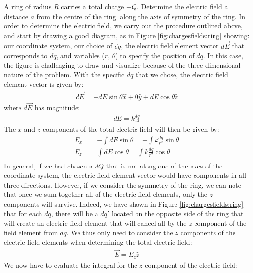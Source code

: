 \begin{example}{\label{ex:chargesfields:ring}A ring of radius $R$ carries a total charge $+Q$. Determine the electric field a distance $a$ from the centre of the ring, along the axis of symmetry of the ring.}
In order to determine the electric field, we carry out the procedure outlined above, and start by drawing a good diagram, as in Figure \ref{fig:chargesfields:ring} showing: our coordinate system, our choice of $dq$, the electric field element vector $d\vec E$ that corresponds to $dq$, and variables ($r$, $\theta$) to specify the position of $dq$.
In this case, the figure is challenging to draw and visualize because of the three-dimensional nature of the problem. With the specific $dq$ that we chose, the electric field element vector is given by:
\begin{align*}
d\vec E = -dE\sin\theta \hat x + 0\hat y + dE\cos\theta \hat z 
\end{align*}
where $d\vec E$ has magnitude:
\begin{align*}
dE = k\frac{dq}{r^2}
\end{align*}
The $x$ and $z$ components of the total electric field will then be given by:
\begin{align*}
E_x &= -\int dE\sin\theta=-\int k\frac{dq}{r^2}\sin\theta\\
E_z &= \int dE\cos\theta=\int k\frac{dq}{r^2}\cos\theta \\
\end{align*}
In general, if we had chosen a $dQ$ that is not along one of the axes of the coordinate system, the electric field element vector would have components in all three directions. However, if we consider the symmetry of the ring, we can note that once we sum together all of the electric field elements, only the $z$ components will survive. Indeed, we have shown in Figure \ref{fig:chargesfields:ring} that for each $dq$, there will be a $dq'$ located on the opposite side of the ring that will create an electric field element that will cancel all by the $z$ component of the field element from $dq$. We thus only need to consider the $z$ components of the electric field elements when determining the total electric field:
\begin{align*}
\vec E = E_z\hat z
\end{align*}
We now have to evaluate the integral for the $z$ component of the electric field:

\end{example}
